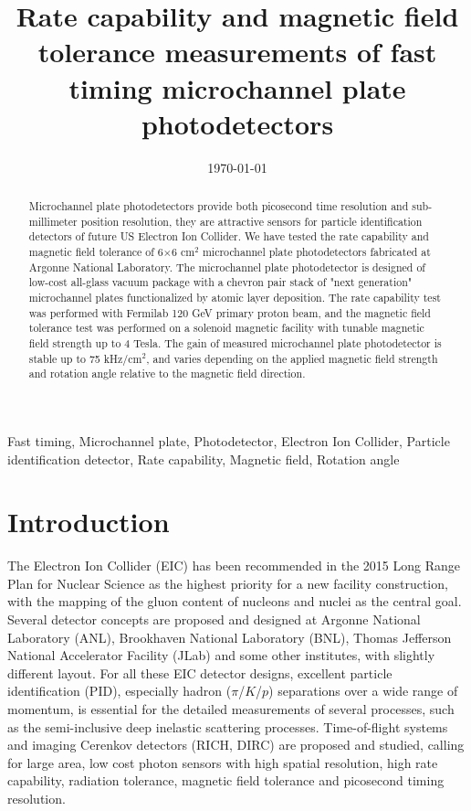 \documentclass[preprint,5p]{elsarticle}
\title{\vspace{-15mm}\fontsize{24pt}{10pt}\selectfont\textbf{Rate capability and magnetic field tolerance measurements of fast timing microchannel plate photodetectors}}
\date{\today}
\begin{document}
\begin{abstract}
Microchannel plate photodetectors provide both picosecond time resolution and sub-millimeter position resolution, they are attractive sensors for particle identification detectors of future US Electron Ion Collider. We have tested the rate capability and magnetic field tolerance of 6$\times$6 cm$^{2}$ microchannel plate photodetectors fabricated at Argonne National Laboratory. The microchannel plate photodetector is designed of low-cost all-glass vacuum package with a chevron pair stack of "next generation" microchannel plates functionalized by atomic layer deposition. The rate capability test was performed with Fermilab 120 GeV primary proton beam, and the magnetic field tolerance test was performed on a solenoid magnetic facility with tunable magnetic field strength up to 4 Tesla. The gain of measured microchannel plate photodetector is stable up to 75 kHz/cm$^{2}$, and varies depending on the applied magnetic field strength and rotation angle relative to the magnetic field direction.
\end{abstract}

\maketitle

\begin{keywords}Fast timing, Microchannel plate, Photodetector, Electron Ion Collider, Particle identification detector, Rate capability, Magnetic field, Rotation angle
\end{keywords}


\section{Introduction} \label{sec:level1}
The Electron Ion Collider (EIC) \cite{EIC} has been recommended in the 2015 Long Range Plan for Nuclear Science \cite{LRP} as the highest priority for a new facility construction, with the mapping of the gluon content of nucleons and nuclei as the central goal. Several detector concepts are proposed and designed at Argonne National Laboratory (ANL), Brookhaven National Laboratory (BNL), Thomas Jefferson National Accelerator Facility (JLab) and some other institutes, with slightly different layout. For all these EIC detector designs, excellent particle identification (PID), especially hadron ($\pi$/$K$/$p$) separations over a wide range of momentum, is essential for the detailed measurements of several processes, such as the semi-inclusive deep inelastic scattering processes. Time-of-flight systems and imaging Cerenkov detectors (RICH, DIRC) \cite{RICH,RICH2,DRIC} are proposed and studied, calling for large area, low cost photon sensors with high spatial resolution, high rate capability, radiation tolerance, magnetic field tolerance and picosecond timing resolution. 
\end{document}
